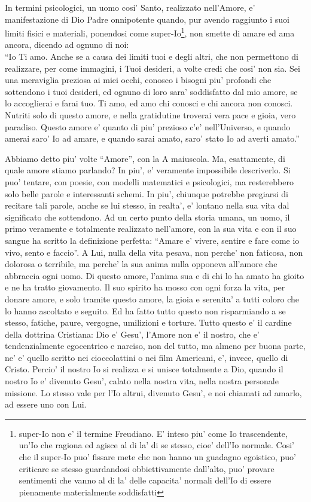 In termini psicologici, un uomo cosi' Santo, realizzato nell'Amore, e' manifestazione di Dio Padre onnipotente quando, pur avendo raggiunto i suoi limiti fisici e materiali, ponendosi come super-Io\footnote{super-Io non e' il termine Freudiano. E' inteso piu' come Io trascendente, un'Io che ragiona ed agisce al di la' di se stesso, cioe' dell'Io normale. Cosi' che il super-Io puo' fissare mete che non hanno un guadagno egoistico, puo' criticare se stesso guardandosi obbiettivamente dall'alto, puo' provare sentimenti che vanno al di la' delle capacita' normali dell'Io di essere pienamente materialmente soddisfatti}, non smette di amare ed ama ancora, dicendo ad ognuno di noi: \\
``Io Ti amo. Anche se a causa dei limiti tuoi e degli altri, che non permettono di realizzare, per come immagini, i Tuoi desideri, a volte credi che cosi' non sia. Sei una meraviglia preziosa ai miei occhi, conosco i bisogni piu' profondi che sottendono i tuoi desideri, ed ognuno di loro sara' soddisfatto dal mio amore, se lo accoglierai e farai tuo. Ti amo, ed amo chi conosci e chi ancora non conosci. Nutriti solo di questo amore, e nella gratidutine troverai vera pace e gioia, vero paradiso. Questo amore e' quanto di piu' prezioso c'e' nell'Universo, e quando amerai saro' Io ad amare, e quando sarai amato, saro' stato Io ad averti amato.''

Abbiamo detto piu' volte ``Amore'', con la A maiuscola. Ma, esattamente, di quale amore stiamo parlando? In piu', e' veramente impossibile descriverlo. Si puo' tentare, con poesie, con modelli matematici e psicologici, ma resterebbero solo belle parole e interessanti schemi. In piu', chiunque potrebbe pregiarsi di recitare tali parole, anche se lui stesso, in realta', e' lontano nella sua vita dal significato che sottendono. Ad un certo punto della storia umana, un uomo, il primo veramente e totalmente realizzato nell'amore, con la sua vita e con il suo sangue ha scritto la definizione perfetta: ``Amare e' vivere, sentire e fare come io vivo, sento e faccio''.
A Lui, nulla della vita pesava, non perche' non faticosa, non dolorosa o terribile,
ma perche' la sua anima nulla opponeva all'amore che abbraccia ogni uomo.
Di questo amore, l'anima sua e di chi lo ha amato ha gioito e ne ha tratto giovamento.
Il suo spirito ha mosso con ogni forza la vita, per donare amore, e solo tramite questo amore,
la gioia e serenita' a tutti coloro che lo hanno ascoltato e seguito.
Ed ha fatto tutto questo non risparmiando a se stesso, fatiche, paure, vergogne, umilizioni e torture.
Tutto questo e' il cardine della dottrina Cristiana: Dio e' Gesu', l'Amore non e' il nostro, che e' tendenzialmente egocentrico e narciso, non del tutto, ma almeno per buona parte, ne' e' quello scritto nei cioccolattini o nei film Americani, e', invece, quello di Cristo.
Percio' il nostro Io si realizza e si unisce totalmente a Dio, quando il nostro Io e' divenuto Gesu',
calato nella nostra vita, nella nostra personale missione.
Lo stesso vale per l'Io altrui, divenuto Gesu', e noi chiamati ad amarlo, ad essere uno con Lui.

